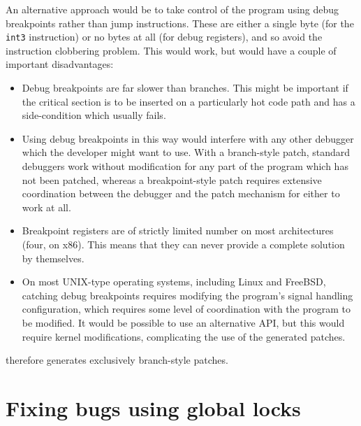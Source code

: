 An alternative approach would be to take control of the program using
debug breakpoints rather than jump instructions.  These are either a
single byte (for the \verb|int3| instruction) or no bytes at all (for
debug registers), and so avoid the instruction clobbering problem.
This would work, but would have a couple of important disadvantages:

\begin{itemize}
\item
  Debug breakpoints are far slower than branches.  This might be
  important if the critical section is to be inserted on
  a particularly hot code path and has a side-condition which usually
  fails.
\item
  Using debug breakpoints in this way would interfere with any other
  debugger which the developer might want to use.  With a branch-style
  patch, standard debuggers work without modification for any part of
  the program which has not been patched, whereas a breakpoint-style
  patch requires extensive coordination between the debugger and the
  patch mechanism for either to work at all.
\item
  Breakpoint registers are of strictly limited number on most
  architectures (four, on x86).  This means that they can never
  provide a complete solution by themselves.
\item
  On most UNIX-type operating systems, including Linux and FreeBSD,
  catching debug breakpoints requires modifying the program's signal
  handling configuration, which requires some level of coordination
  with the program to be modified.  It would be possible to use an
  alternative API, but this would require kernel modifications,
  complicating the use of the generated patches.
\end{itemize}

{\Implementation} therefore generates exclusively branch-style patches.



\section{Fixing bugs using global locks}
\label{sect:fix_global_lock}

